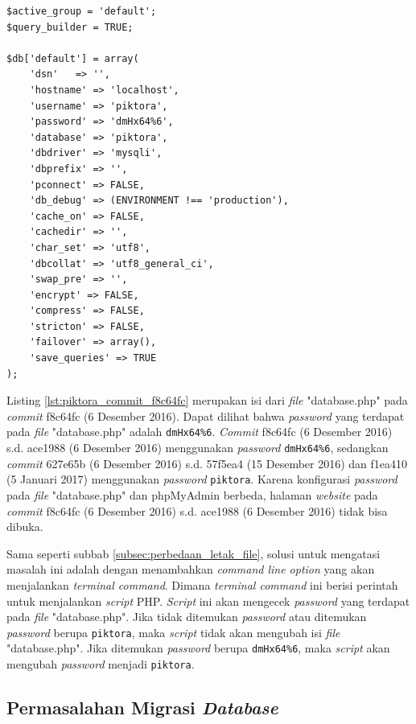 \begin{lstlisting}[caption={Isi \textit{file} "database.php" pada \textit{commit} f8c64fc(6 Desember 2016)},label={lst:piktora_commit_f8c64fc},language=plaintext]
$active_group = 'default';
$query_builder = TRUE;

$db['default'] = array(
	'dsn'	=> '',
	'hostname' => 'localhost',
	'username' => 'piktora',
	'password' => 'dmHx64%6',
	'database' => 'piktora',
	'dbdriver' => 'mysqli',
	'dbprefix' => '',
	'pconnect' => FALSE,
	'db_debug' => (ENVIRONMENT !== 'production'),
	'cache_on' => FALSE,
	'cachedir' => '',
	'char_set' => 'utf8',
	'dbcollat' => 'utf8_general_ci',
	'swap_pre' => '',
	'encrypt' => FALSE,
	'compress' => FALSE,
	'stricton' => FALSE,
	'failover' => array(),
	'save_queries' => TRUE
);
\end{lstlisting}

Listing \ref{lst:piktora_commit_f8c64fc} merupakan isi dari \textit{file} "database.php" pada \textit{commit} f8c64fc (6 Desember 2016). Dapat dilihat bahwa \textit{password} yang terdapat pada \textit{file} "database.php" adalah \texttt{dmHx64\%6}. \textit{Commit} f8c64fc (6 Desember 2016) s.d. ace1988 (6 Desember 2016) menggunakan \textit{password} \texttt{dmHx64\%6}, sedangkan \textit{commit} 627e65b (6 Desember 2016) s.d. 57f5ea4 (15 Desember 2016) dan f1ea410 (5 Januari 2017) menggunakan \textit{password} \texttt{piktora}. Karena konfigurasi \textit{password} pada \textit{file} "database.php" dan phpMyAdmin berbeda, halaman \textit{website} pada \textit{commit} f8c64fc (6 Desember 2016) s.d. ace1988 (6 Desember 2016) tidak bisa dibuka. 

Sama seperti subbab \ref{subsec:perbedaan_letak_file}, solusi untuk mengatasi masalah ini adalah dengan menambahkan \textit{command line option} yang akan menjalankan \textit{terminal command}. Dimana \textit{terminal command} ini berisi perintah untuk menjalankan \textit{script} PHP. \textit{Script} ini akan mengecek \textit{password} yang terdapat pada \textit{file} "database.php". Jika tidak ditemukan \textit{password} atau ditemukan \textit{password} berupa \texttt{piktora}, maka \textit{script} tidak akan mengubah isi \textit{file} "database.php". Jika ditemukan \textit{password} berupa \texttt{dmHx64\%6}, maka \textit{script} akan mengubah \textit{password} menjadi \texttt{piktora}. 

\subsection{Permasalahan Migrasi \textit{Database}}
\label{subsec:migrasi_database}

